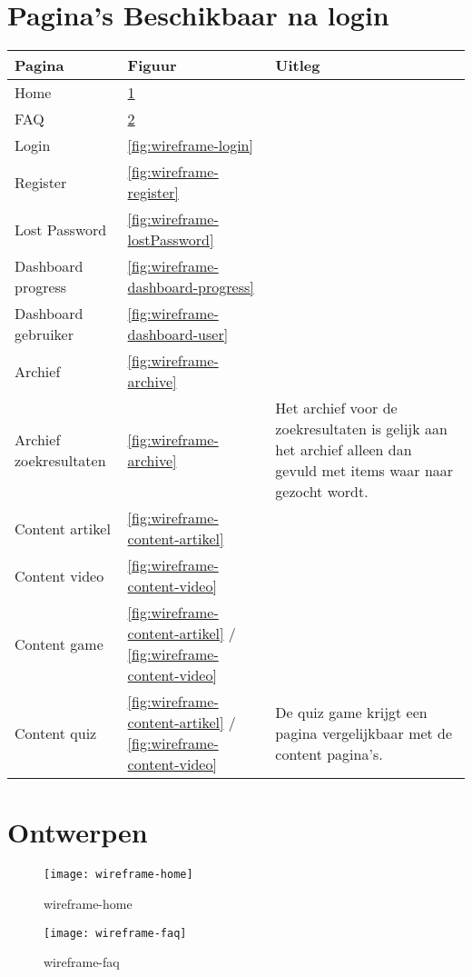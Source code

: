 \documentclass[]{report}
\begin{document}
\section{Pagina's Beschikbaar na login}
\begin{tabular}{ l l p{6cm} }
	\textbf{Pagina} & \textbf{Figuur} & \textbf{Uitleg}\\ \hline
	Home 					& \ref{fig:wireframe-home}	\\
	FAQ 					& \ref{fig:wireframe-faq}	\\
	Login 					& \ref{fig:wireframe-login}	\\
	Register 				& \ref{fig:wireframe-register}	\\
	Lost Password			& \ref{fig:wireframe-lostPassword} \\
	Dashboard progress 		& \ref{fig:wireframe-dashboard-progress}	\\
	Dashboard gebruiker		& \ref{fig:wireframe-dashboard-user}	\\
	Archief 				& \ref{fig:wireframe-archive}	\\
	Archief zoekresultaten	& \ref{fig:wireframe-archive}	& Het archief voor de zoekresultaten is gelijk aan het archief alleen dan gevuld met items waar naar gezocht wordt.\\
	Content artikel 		& \ref{fig:wireframe-content-artikel}	\\
	Content video 			& \ref{fig:wireframe-content-video} 	\\
	Content game 			& \ref{fig:wireframe-content-artikel} / \ref{fig:wireframe-content-video}	& \\
	Content quiz 			& \ref{fig:wireframe-content-artikel} / \ref{fig:wireframe-content-video}  & De quiz game krijgt een pagina vergelijkbaar met de content pagina's. \\
\end{tabular}

\section{Ontwerpen}

\begin{figure}
	\centering
	\texttt{[image: wireframe-home]}
	\caption{wireframe-home}
	\label{fig:wireframe-home}
\end{figure}

\begin{figure}
	\centering
	\texttt{[image: wireframe-faq]}
	\caption{wireframe-faq}
	\label{fig:wireframe-faq}
\end{figure}
\end{document}
